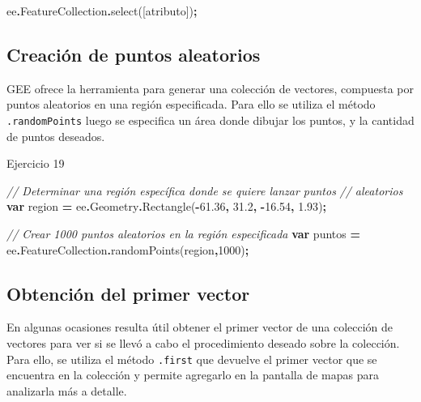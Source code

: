 \documentclass[
  12pt,
  letterpaper,
  twoside]{book}
\newenvironment{Shaded}{\begin{snugshade}}{\end{snugshade}}
\newcommand{\AttributeTok}[1]{\textcolor[rgb]{0.77,0.63,0.00}{#1}}
\newcommand{\CommentTok}[1]{\textcolor[rgb]{0.56,0.35,0.01}{\textit{#1}}}
\newcommand{\DecValTok}[1]{\textcolor[rgb]{0.00,0.00,0.81}{#1}}
\newcommand{\FloatTok}[1]{\textcolor[rgb]{0.00,0.00,0.81}{#1}}
\newcommand{\FunctionTok}[1]{\textcolor[rgb]{0.00,0.00,0.00}{#1}}
\newcommand{\KeywordTok}[1]{\textcolor[rgb]{0.13,0.29,0.53}{\textbf{#1}}}
\newcommand{\NormalTok}[1]{#1}
\newcommand{\OperatorTok}[1]{\textcolor[rgb]{0.81,0.36,0.00}{\textbf{#1}}}
\newcommand{\StringTok}[1]{\textcolor[rgb]{0.31,0.60,0.02}{#1}}
\begin{document}
\begin{Shaded}
\begin{Highlighting}[]
\NormalTok{ee}\OperatorTok{.}\AttributeTok{FeatureCollection}\OperatorTok{.}\FunctionTok{select}\NormalTok{([}\StringTok{\textquotesingle{}atributo\textquotesingle{}}\NormalTok{])}\OperatorTok{;}
\end{Highlighting}
\end{Shaded}

\hypertarget{creaciuxf3n-de-puntos-aleatorios}{%
\subsection{Creación de puntos aleatorios}\label{creaciuxf3n-de-puntos-aleatorios}}

GEE ofrece la herramienta para generar una colección de vectores, compuesta por puntos aleatorios en una región especificada. Para ello se utiliza el método \texttt{.randomPoints} luego se especifica un área donde dibujar los puntos, y la cantidad de puntos deseados.

Ejercicio 19

\begin{Shaded}
\begin{Highlighting}[]
\CommentTok{// Determinar una región específica donde se quiere lanzar puntos }
\CommentTok{// aleatorios}
\KeywordTok{var}\NormalTok{ region }\OperatorTok{=}\NormalTok{ ee}\OperatorTok{.}\AttributeTok{Geometry}\OperatorTok{.}\FunctionTok{Rectangle}\NormalTok{(}\OperatorTok{{-}}\FloatTok{61.36}\OperatorTok{,} \FloatTok{31.2}\OperatorTok{,} \OperatorTok{{-}}\FloatTok{16.54}\OperatorTok{,} \FloatTok{1.93}\NormalTok{)}\OperatorTok{;}

\CommentTok{// Crear 1000 puntos aleatorios en la región especificada}
\KeywordTok{var}\NormalTok{ puntos }\OperatorTok{=}\NormalTok{ ee}\OperatorTok{.}\AttributeTok{FeatureCollection}\OperatorTok{.}\FunctionTok{randomPoints}\NormalTok{(region}\OperatorTok{,}\DecValTok{1000}\NormalTok{)}\OperatorTok{;}
\end{Highlighting}
\end{Shaded}

\hypertarget{obtenciuxf3n-del-primer-vector}{%
\subsection{Obtención del primer vector}\label{obtenciuxf3n-del-primer-vector}}

En algunas ocasiones resulta útil obtener el primer vector de una colección de vectores para ver si se llevó a cabo el procedimiento deseado sobre la colección. Para ello, se utiliza el método \texttt{.first} que devuelve el primer vector que se encuentra en la colección y permite agregarlo en la pantalla de mapas para analizarla más a detalle.
\end{document}
